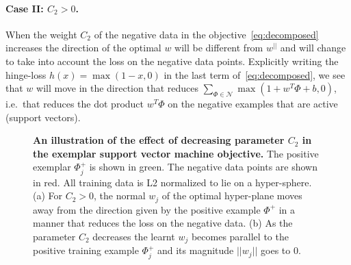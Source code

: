 \documentclass[10pt,twocolumn,letterpaper]{article}
\begin{document}
      \paragraph{Case II: $C_2>0$.}
         When the weight $C_2$ of the negative data in the objective~\eqref{eq:decomposed} increases the direction of the optimal $w$ will be different from $w^{||}$ and will change to take into account the loss on the negative data points. Explicitly writing the hinge-loss $h(x) = \max(1-x,0)$ in the last term of~\eqref{eq:decomposed}, we see that $w$ will move in the direction that reduces $\sum_{\Phi\in \mathcal N}\max \left(1+w^T \Phi + b ,0 \right)$, i.e.\ that reduces the dot product $w^T \Phi$ on the negative examples that are active (support vectors).
            \begin{figure}[t]
               \begin{center}
                  \caption{
                     {\bf An illustration of the effect of decreasing parameter $C_2$ in the exemplar support vector machine objective.} 
                     The positive exemplar $\Phi_j^+$ is shown in green. The negative data points are shown in red. All training data is L2 normalized to lie on a hyper-sphere. (a) For $C_2>0$, the normal $w_j$ of the optimal hyper-plane moves away from the direction given by the positive example $\Phi^+$ in a manner that reduces the loss on the negative data.  (b) As the parameter $C_2$ decreases the learnt $w_j$ becomes parallel to the positive training example $\Phi_j^+$ and its magnitude $||w_j||$ goes to 0.
                  }
                  \label{fig:C2effect}
               \end{center}
            \end{figure}
\end{document}
